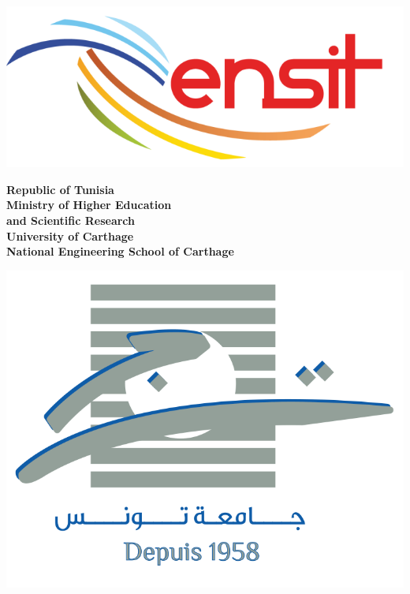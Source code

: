 \thispagestyle{cover}%
\hspace{-47pt}
\begin{minipage}[l]{0.2\columnwidth}
    \vspace{6mm}
    \includegraphics[width=1.1\columnwidth]{img/ensit logo.png}\\
\end{minipage}
\hfill
\begin{minipage}[l]{0.6\columnwidth}
    \centering
    \footnotesize
    \textbf{{Republic of Tunisia}}\\
    \vspace{1.5mm}
    \textbf{{Ministry of Higher Education\\
                and Scientific Research}}\\
    \vspace{1.5mm}
    \textbf{{University of Carthage }}\\
    \vspace{1.5mm}
    \textbf{{National Engineering School of Carthage}}
\end{minipage}
\hfill
\begin{minipage}[l]{0.02\columnwidth}
\end{minipage}
\hfill
\begin{minipage}[l]{0.18\columnwidth}
    \vspace{6mm}
    \includegraphics[width=1.1\columnwidth]{img/UT PNG.png}\\
\end{minipage}
\vskip1.5cm

